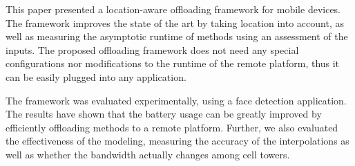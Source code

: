 \documentclass[10pt, conference, letterpaper]{IEEEtran}
\begin{document}
This paper presented a location-aware offloading framework for mobile devices. The framework improves the state of the art by taking location into account, as well as measuring the asymptotic runtime of methods using an assessment of the inputs. The proposed offloading framework does not need any special configurations nor modifications to the runtime of the remote platform, thus it can be easily plugged into any application. 

The framework was evaluated experimentally, using a face detection application. The results have shown that the battery usage can be greatly improved by efficiently offloading methods to a remote platform. Further, we also evaluated the effectiveness of the modeling, measuring the accuracy of the interpolations as well as whether the bandwidth actually changes among cell towers.
\end{document}
